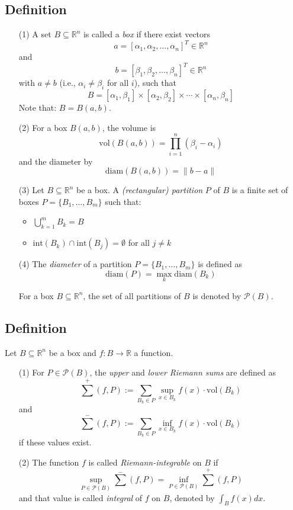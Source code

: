 \documentclass{article}
\begin{document}
\subsection*{Definition}
\begin{enumerate}
\item[(1)] A set $B \subseteq \mathbb{R}^n$ is called a \textit{box} if there exist vectors 
\[ a = [\alpha_1, \alpha_2, \ldots, \alpha_n]^T \in \mathbb{R}^n \]
and
\[ b = [\beta_1, \beta_2, \ldots, \beta_n]^T \in \mathbb{R}^n \]
with $a \neq b$ (i.e., $\alpha_i \neq \beta_i$ for all $i$), such that
\[ B = [\alpha_1,\beta_1] \times [\alpha_2,\beta_2] \times \cdots \times [\alpha_n,\beta_n] \]
Note that: $B = B(a,b)$.

\item[(2)] For a box $B(a,b)$, the volume is
\[ \text{vol}(B(a,b)) = \prod_{i=1}^n (\beta_i - \alpha_i) \]
and the diameter by
\[ \text{diam}(B(a,b)) = \|b-a\| \]

\item[(3)] Let $B \subseteq \mathbb{R}^n$ be a box. A \textit{(rectangular) partition} $P$ of $B$ is a finite set of boxes $P = \{B_1, \ldots, B_m\}$ such that:
\begin{itemize}
\item $\bigcup_{k=1}^m B_k = B$
\item $\text{int}(B_k) \cap \text{int}(B_j) = \emptyset$ for all $j \neq k$
\end{itemize}

\item[(4)] The \textit{diameter} of a partition $P = \{B_1, \ldots, B_m\}$ is defined as
\[ \text{diam}(P) = \max_k \text{diam}(B_k) \]

For a box $B \subseteq \mathbb{R}^n$, the set of all partitions of $B$ is denoted by $\mathcal{P}(B)$.
\end{enumerate}

\subsection*{Definition}
Let $B \subseteq \mathbb{R}^n$ be a box and $f:B \rightarrow \mathbb{R}$ a function.

\begin{enumerate}
\item[(1)] For $P \in \mathcal{P}(B)$, the \textit{upper} and \textit{lower Riemann sums} are defined as
\[ \sum^+(f,P) := \sum_{B_k \in P} \sup_{x \in B_k} f(x) \cdot \text{vol}(B_k) \]
and
\[ \sum^-(f,P) := \sum_{B_k \in P} \inf_{x \in B_k} f(x) \cdot \text{vol}(B_k) \]
if these values exist.

\item[(2)] The function $f$ is called \textit{Riemann-integrable} on $B$ if
\[ \sup_{P \in \mathcal{P}(B)} \sum^-(f,P) = \inf_{P \in \mathcal{P}(B)} \sum^+(f,P) \]
and that value is called \textit{integral} of $f$ on $B$, denoted by $\int_B f(x) dx$.
\end{enumerate}
    \begin{tikzpicture}[scale=1.2]
       
    \end{tikzpicture}
\end{document}
